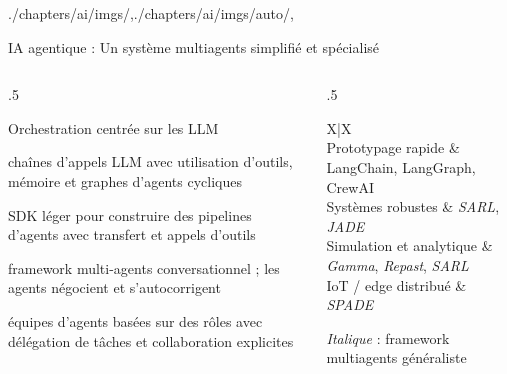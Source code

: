 \begin{graphicspathcontext}{{./chapters/ai/imgs/},{./chapters/ai/imgs/auto/},\old}
\begin{frame}[t]{{IA agentique :} Un système multiagents simplifié et spécialisé}
	\small
	\begin{columns}
		\begin{column}{.5\linewidth}
			\begin{block}{Orchestration centrée sur les LLM}
				\begin{compactdescription}
				\item[LangChain / LangGraph] chaînes d'appels LLM avec
				utilisation d'outils, mémoire et graphes d'agents cycliques
				\item[OpenAI Agents SDK] SDK léger pour construire des
				pipelines d'agents avec transfert et appels d'outils
				\item[AutoGen (Microsoft)] framework multi-agents conversationnel ;
				les agents négocient et s'autocorrigent
				\item[CrewAI] équipes d'agents basées sur des rôles avec
				délégation de tâches et collaboration explicites
				\end{compactdescription}
			\end{block}
    		\end{column}
		\begin{column}{.5\linewidth}
			\begin{stabularx}[title={Choisir le bon outil}]{X|X}
			 \\
			Prototypage rapide & LangChain, LangGraph, CrewAI \\
			\hline
			Systèmes robustes & \textit{SARL}, \textit{JADE} \\
			\hline
			Simulation et analytique & \textit{Gamma}, \textit{Repast}, \textit{SARL} \\
			\hline
			IoT / edge distribué & \textit{SPADE}  \\
			\end{stabularx}
			{\smaller\smaller \textit{Italique} : framework multiagents généraliste}
    		\end{column}
	\end{columns}
	\normalsize
\end{frame}

\end{graphicspathcontext}

\endinput

